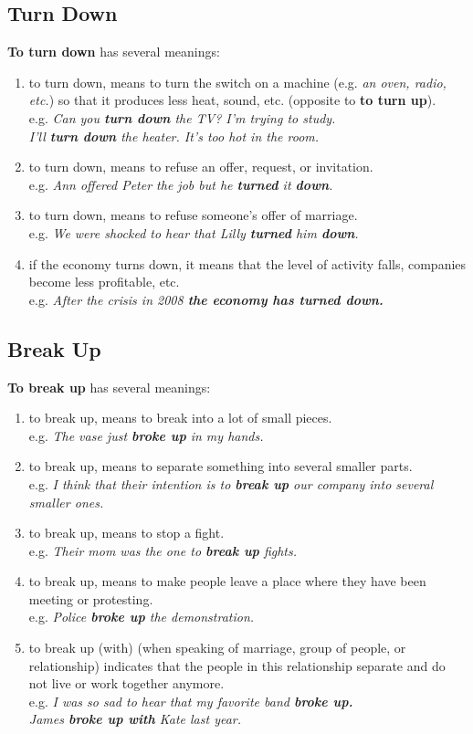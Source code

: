 \documentclass[hidelinks,10pt,a4paper]{article}
\begin{document}
\subsection{Turn Down}
\textbf{To turn down} has several meanings:
\begin{enumerate}[label=(\alph*)]
	\item to turn down, means to turn the switch on a machine (e.g. \textit{an oven, radio, etc.}) so that it produces less heat, sound, etc. (opposite to \textbf{to turn up}). \\
		e.g. \textit{Can you \textbf{turn down} the TV? I'm trying to study.\\
		I'll \textbf{turn down} the heater. It's too hot in the room. }
	\item to turn down, means to refuse an offer, request, or invitation.\\
		e.g. \textit{Ann offered Peter the job but he \textbf{turned} it \textbf{down}.}
	\item to turn down, means to refuse someone's offer of marriage. \\
		e.g. \textit{We were shocked to hear that Lilly \textbf{turned} him \textbf{down}.}
	\item if the economy turns down, it means that the level of activity falls, companies become less profitable, etc. \\
		e.g. \textit{After the crisis in 2008 \textbf{the economy has turned down.} }
\end{enumerate}

\subsection{Break Up}
\textbf{To break up} has several meanings:
\begin{enumerate}[label=(\alph*)]
	\item to break up, means to break into a lot of small pieces. \\
		e.g. \textit{The vase just \textbf{broke up} in my hands.}
	\item to break up, means to separate something into several smaller parts. \\
		e.g. \textit{I think that their intention is to \textbf{break up} our company into several smaller ones. }
	\item to break up, means to stop a fight. \\
		e.g. \textit{Their mom was the one to \textbf{break up} fights.}
	\item to break up, means to make people leave a place where they have been meeting or protesting. \\
		e.g. \textit{Police \textbf{broke up} the demonstration. }
	\item to break up (with) (when speaking of marriage, group of people, or relationship) indicates that the people in this relationship separate and do not live or work together anymore. \\
		e.g. \textit{I was so sad to hear that my favorite band \textbf{broke up.}\\
		James \textbf{broke up with} Kate last year. }
\end{enumerate}
\end{document}
